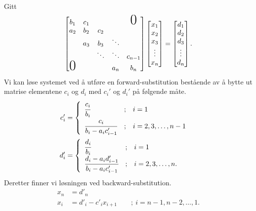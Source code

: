 \documentclass[11pt]{article}
\begin{document}
Gitt 
\begin{align*}
  \begin{bmatrix}
   {b_1} & {c_1} &  &  & \text{\huge0} \\
   {a_2} & {b_2} & {c_2} &  &  \\
    & {a_3} & {b_3} & \ddots &  \\
    &  & \ddots & \ddots & {c_{n-1}}\\
     \text{\huge0}&  &  & {a_n} & {b_n}\\
\end{bmatrix}
\begin{bmatrix}
   {x_1 }  \\
   {x_2 }  \\
   {x_3 }  \\
   \vdots   \\
   {x_n }  \\
\end{bmatrix}
=
\begin{bmatrix}
   {d_1 }  \\
   {d_2 }  \\
   {d_3 }  \\
   \vdots   \\
   {d_n }  \\
\end{bmatrix}.
\end{align*}
Vi kan løse systemet ved å utføre en forward-substitution bestående av
å bytte ut matrise elementene $c_i$ og $d_i$ med $c_i'$ og $d_i'$ på følgende måte.
\begin{align*}
  c_i' &= \begin{cases}
\begin{array}{lcl}
  \cfrac{c_i}{b_i}                  & ; & i = 1 \\
  \cfrac{c_i}{b_i - a_i c'_{i - 1}} & ; & i = 2, 3, \dots, n-1 \\
\end{array}
\end{cases}\\
d_i' &= \begin{cases}
\begin{array}{lcl}
  \cfrac{d_i}{b_i}                  & ; & i = 1 \\
  \cfrac{d_i - a_i d'_{i - 1}}{b_i - a_i c'_{i - 1}} & ; & i = 2, 3, \dots, n. \\
\end{array}
\end{cases}
\end{align*}
Deretter finner vi løsningen ved backward-substitution.
\begin{align*}
  x_n &= d'_n\\
  x_i &= d'_i - c'_i x_{i + 1} \qquad ; \ i = n - 1, n - 2, \ldots, 1.
\end{align*}
\end{document}
